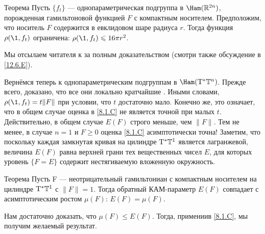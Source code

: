 \begin{thm}{Теорема}\label{8.2.A}
Пусть $\{f_t\}$ — однопараметрическая подгруппа в $\Ham (\RR^{2n})$,
порожденная гамильтоновой функцией $F$ с компактным носителем. 
Предположим, что носитель $F$ содержится в евклидовом шаре радиуса
$r$. 
Тогда функция $\rho (\1, f_t)$ ограничена: $\rho (\1, f_t) \z\le 16\pi
r^2$. 
\end{thm}

Мы отсылаем читателя к \cite[с. 177]{HZ} за полным доказательством (смотри также обсуждение в \ref{12.6.E}). 

Вернёмся теперь к однопараметрическим подгруппам в $\Ham (\T^\ast \TT^n)$.
Прежде всего, доказано, что все они локально кратчайшие \cite{LM2}.
Иными словами, $\rho (\1, f_t) = t \| F \|$ при условии, что $t$
достаточно мало. 
Конечно же, это означает, что в общем случае оценка в \ref{8.1.C} не является
точной при малых $t$. 
Действительно, в общем случае $E (F)$ строго меньше, чем $\| F \|$.
Тем не менее, в случае $n = 1$ и $F \ge 0$ оценка \ref{8.1.C}
асимптотически точна! 
Заметим, что поскольку каждая замкнутая кривая на цилиндре $\mathrm{T}^\ast
\mathbb{T}^1$ является лагранжевой, величина $E (F)$ равна верхней грани тех
вещественных чисел $E$, для которых уровень $\{F = E\}$ содержит
нестягиваемую вложенную окружность. 

\begin{thm}[(\cite{PS})]{Теорема}\label{8.2.B}
  Пусть F — неотрицательный гамильтониан с компактным носителем на
  цилиндре $\mathrm{T}^\ast \mathbb{T}^1$ с $\| F \| = 1$. 
  Тогда обратный КАМ-параметр $E (F)$ совпадает с асимптотическим
  ростом $\mu (F)$: $E (F) = \mu (F)$. 
\end{thm}

Нам достаточно доказать, что $\mu (F) \le E (F)$.
Тогда, примениив \ref{8.1.C}, мы получим желаемый результат.

